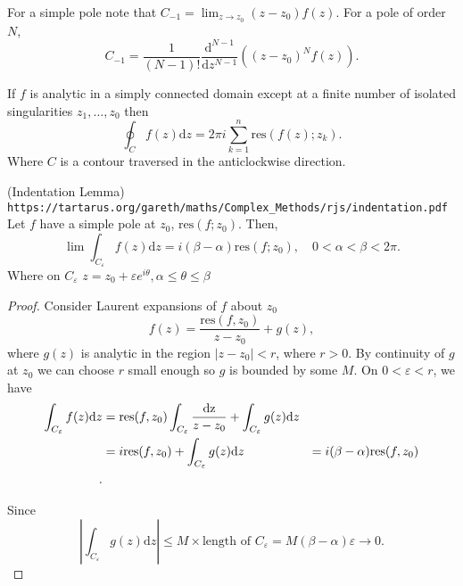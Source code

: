 \documentclass[a4paper]{article}
\begin{document}
For a simple pole note that $C_{-1} = \lim_{ z \to z_0} (z - z_0) f(z)$. For a pole of order $N$, 
\[
    C_{-1} = \frac{1}{(N - 1)!} \frac{ \text {d} ^{N - 1}}{\text{d}z^{N - 1}} ( (z - z_0)^{N}f(z))
.\] 
\begin{thm}
    If $f$ is analytic in a simply connected domain except at a finite number of isolated singularities $z_1, \ldots, z_0$ then
    \[
        \oint_C f(z) \text{d}z = 2 \pi i \sum_{k =1}^{n} \text{res} (f(z) ; z_k)
    .\] 
Where $C$ is a contour traversed in the anticlockwise direction.
\end{thm}
\begin{lemma}
    (Indentation Lemma) \verb |https://tartarus.org/gareth/maths/Complex_Methods/rjs/indentation.pdf|  \\
    Let $f $ have a simple pole at $z_0$, $\text{res}(f; z_0)$. Then, 
    \[
        \lim \int_{C_{\varepsilon}} f(z) \text{d}z = i(\beta - \alpha) \text{res}(f; z_0), \quad 0 < \alpha < \beta< 2\pi 
    .\] 
    Where on $C_{\varepsilon}$ $z  = z_0 + \varepsilon e^{ i \theta}, \alpha \le \theta \le \beta$
\end{lemma}
\begin{proof}
Consider Laurent expansions of $f$ about $z_0$
\[
    f(z) = \frac{\text{res}(f, z_0)}{ z - z_0} + g(z)
,\]
where $g(z)$ is analytic in the region $| z - z_0| < r$, where $r > 0 $. By continuity of $g$ at $z_0$ we can choose $r$ small enough so $g $ is bounded by some $M$. On $0 < \varepsilon < r$, we have 
\begin{align*}
    \int_{ C_{\varepsilon}} f(z)\text{d}z  &= \text{res}(f, z_0) \int_{C_{\varepsilon}} \frac{\text{dz}}{ z - z_0} + \int_{C_{\varepsilon}} g(z) \text{d}z \\
    &= i\text{res} (f, z_0) + \int_{C_{\varepsilon}} g(z) \text d z 
    &= i( \beta - \alpha) \text{res} (f, z_0) \\
.\end{align*}

Since 
\[
    \left| \int_{C_{\varepsilon}} g(z) \text{d}z \right|  \le M \times  \text{length of } C_{\varepsilon}  = M (\beta - \alpha) \varepsilon \to 0
.\] 
\end{proof}
\end{document}
